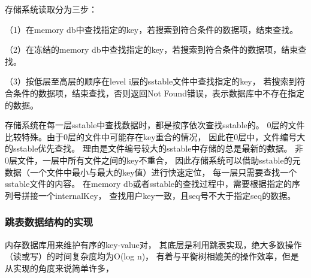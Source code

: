 \begin{enumerate}
		存储系统读取分为三步：

		（1）在memory db中查找指定的key，若搜索到符合条件的数据项，结束查找。

		（2）在冻结的memory db中查找指定的key，若搜索到符合条件的数据项，结束查找。
		
		（3）按低层至高层的顺序在level i层的sstable文件中查找指定的key，
		若搜索到符合条件的数据项，结束查找，否则返回Not Found错误，表示数据库中不存在指定的数据。
		
		存储系统在每一层sstable中查找数据时，都是按序依次查找sstable的。
		0层的文件比较特殊。由于0层的文件中可能存在key重合的情况，
		因此在0层中，文件编号大的sstable优先查找。
		理由是文件编号较大的sstable中存储的总是最新的数据。
		非0层文件，一层中所有文件之间的key不重合，
		因此存储系统可以借助sstable的元数据（一个文件中最小与最大的key值）进行快速定位，
		每一层只需要查找一个sstable文件的内容。
		在memory db或者sstable的查找过程中，需要根据指定的序列号拼接一个internalKey，
		查找用户key一致，且seq号不大于指定seq的数据。
		
		\end{enumerate}
	
		\subsubsection{跳表数据结构的实现}

		内存数据库用来维护有序的key-value对，
		其底层是利用跳表实现，绝大多数操作（读或写）的时间复杂度均为O(log n)，
		有着与平衡树相媲美的操作效率，但是从实现的角度来说简单许多，

